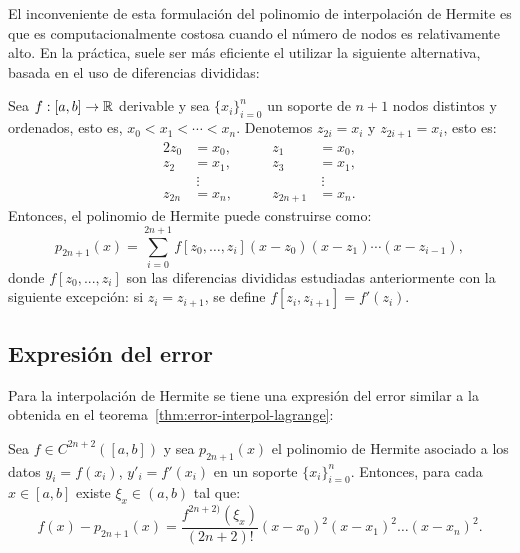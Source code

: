      El inconveniente de esta formulación del polinomio de interpolación de
     Hermite es que es computacionalmente costosa cuando el número de nodos
     es relativamente alto. En la práctica, suele ser más eficiente el
     utilizar la siguiente alternativa, basada en el uso de diferencias
     divididas:


     \begin{theorem}
       \label{thm:formula-newton-hermite}
       Sea $f:[a,b]\to\operatorname{{\mathbb R}}$ derivable y sea $\{x_i\}_{i=0}^n$ un soporte
       de $n+1$ nodos distintos y ordenados, esto es,
       $x_0<x_1<\cdots<x_n$. Denotemos $z_{2i}=x_i$ y $z_{2i+1}=x_i$, esto es:
       \begin{alignat*}{2} %
         z_0&=x_0, & z_1&=x_0,\\
         z_2&=x_1, & z_3&=x_1,\\
         &\ \vdots & &\ \vdots \\
         z_{2n}&=x_n, \qquad & z_{2n+1}&=x_n.
       \end{alignat*}
       Entonces, el polinomio de Hermite puede construirse como:
       \begin{equation*}
         p_{2n+1}(x)=\sum_{i=0}^{2n+1}f[z_0,\dots,z_i]
         (x-z_0)(x-z_1)\cdots(x-z_{i-1}),
       \end{equation*}
       donde $f[z_0,...,z_i]$ son las diferencias divididas estudiadas
       anteriormente con la siguiente excepción: si
       $z_i=z_{i+1}$, se define $f[z_i,z_{i+1}]=f'(z_i)$.
     \end{theorem}

     \subsection*{Expresión del error}
     \label{sec:expresion-del-error-hermite}

     Para la interpolación de Hermite se tiene una expresión del error
     similar a la obtenida en el teorema~\ref{thm:error-interpol-lagrange}:
     \begin{theorem}
       Sea $f\in C^{2n+2}([a,b])$ y sea $p_{2n+1}(x)$ el polinomio de
       Hermite asociado a los datos $y_i=f(x_i)$, $y'_i=f'(x_i)$ en un
       soporte $\{x_i\}_{i=0}^n$. Entonces, para cada $x\in [a,b]$ existe
       $\xi_x\in (a,b)$ tal que:
       \begin{equation*}
         f(x)-p_{2n+1}(x)=\frac{f^{2n+2)}(\xi_x)}{(2n+2)!} (x-x_0)^2(x-x_1)^2\dots(x-x_n)^2.
       \end{equation*}
     \end{theorem}

